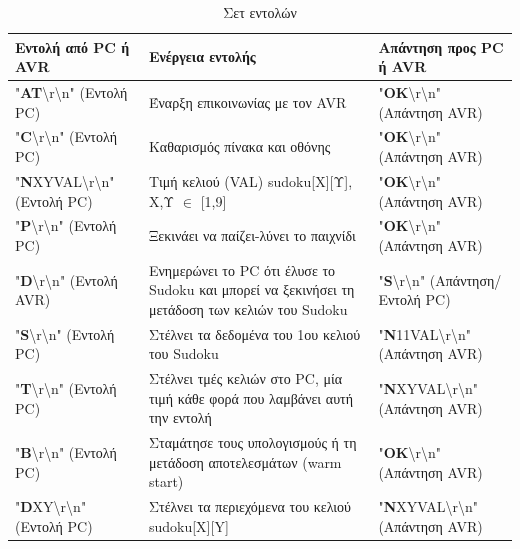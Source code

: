 \documentclass[a4paper,12pt]{article}
\begin{document}
\begin{table}[h!]
\centering
\begin{tabular}[c]{| p{} | p{} | p{} |}
\hline
\textbf{Εντολή από PC ή AVR} & \textbf{Ενέργεια εντολής} & \textbf{Απάντηση προς PC ή AVR} \\
\hline
"\textbf{AT}\textbackslash r\textbackslash n" (Εντολή PC) & Έναρξη επικοινωνίας με τον AVR & "\textbf{OK}\textbackslash r\textbackslash n" (Απάντηση AVR)\\
\hline
"\textbf{C}\textbackslash r\textbackslash n" (Εντολή PC) & Καθαρισμός πίνακα και οθόνης  & "\textbf{OK}\textbackslash r\textbackslash n" (Απάντηση AVR)\\
\hline
"\textbf{N}XYVAL\textbackslash r\textbackslash n" (Εντολή PC) &  Τιμή κελιού (VAL) sudoku[Χ][Υ], Χ,Υ $\in$ [1,9] & "\textbf{OK}\textbackslash r\textbackslash n" (Απάντηση AVR)\\
\hline
"\textbf{P}\textbackslash r\textbackslash n" (Εντολή PC) & Ξεκινάει να παίζει-λύνει το παιχνίδι & "\textbf{OK}\textbackslash r\textbackslash n" (Απάντηση AVR)\\
\hline
"\textbf{D}\textbackslash r\textbackslash n" (Εντολή AVR) & Ενημερώνει το PC ότι έλυσε το Sudoku και μπορεί να ξεκινήσει τη μετάδοση των κελιών του Sudoku & "\textbf{S}\textbackslash r\textbackslash n" (Απάντηση/Εντολή PC)\\
\hline
"\textbf{S}\textbackslash r\textbackslash n" (Εντολή PC) & Στέλνει τα δεδομένα του 1ου κελιού του Sudoku & "\textbf{N}11VAL\textbackslash r\textbackslash n" (Απάντηση AVR)\\
\hline
"\textbf{T}\textbackslash r\textbackslash n" (Εντολή PC) & Στέλνει τμές κελιών στο PC, μία τιμή κάθε φορά που λαμβάνει αυτή την εντολή & "\textbf{N}XYVAL\textbackslash r\textbackslash n" (Απάντηση AVR)\\
\hline
"\textbf{B}\textbackslash r\textbackslash n" (Εντολή PC) & Σταμάτησε τους υπολογισμούς ή τη μετάδοση αποτελεσμάτων (warm start) & "\textbf{OK}\textbackslash r\textbackslash n" (Απάντηση AVR)\\
\hline
"\textbf{D}XY\textbackslash r\textbackslash n" (Εντολή PC) & Στέλνει τα περιεχόμενα του κελιού sudoku[X][Y] & "\textbf{N}XYVAL\textbackslash r\textbackslash n" (Απάντηση AVR)\\
\hline
\end{tabular}
\renewcommand{\arraystretch}{1.2}
\caption{Σετ εντολών}
\label{table:commands}
\end{table}
\end{document}
